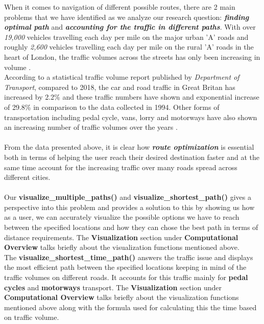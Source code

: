 \documentclass[fontsize=11pt]{IEEEtran}
\begin{document}
When it comes to navigation of different possible routes, there are 2 main problems that we have identified as we analyze our research question: \textbf{\textit{finding optimal path}} and \textbf{\textit{accounting for the traffic in different paths}}. With over \textit{19,000} vehicles travelling each day per mile on the major urban 'A' roads and roughly \textit{2,600} vehicles travelling each day per mile on the rural 'A' roads in the heart of London, the traffic volumes across the streets has only been increasing in volume \cite{9}. \\
According to a statistical traffic volume report published by \textit{Department of Transport}, compared to 2018, the car and road traffic in Great Britan has increased by  2.2\% and these traffic numbers have shown and exponential increase of 29.8\% in comparison to the data collected in 1994. Other forms of transportation including pedal cycle, vans, lorry and motorways have also shown an increasing number of traffic volumes over the years \cite{10}. \\ \\
From the data presented above, it is clear how \textbf{\textit{route optimization}} is essential both in terms of helping the user reach their desired destination faster and at the same time account for the increasing traffic over many roads spread across different cities. \\ \\
Our \textbf{visualize\_multiple\_paths()} and \textbf{visualize\_shortest\_path()} gives a perspective into this problem and provides a solution to this by showing us how as a user, we can accurately visualize the possible options we have to reach between the specified locations and how they can chose the best path in terms of distance requirements. The \textbf{Visualization} section under \textbf{Computational Overview} talks briefly about the visualization functions mentioned above.
\\
The \textbf{visualize\_shortest\_time\_path()} answers the traffic issue and displays the most efficient path between the specified locations keeping in mind of the traffic volumes on different roads. It accounts for this traffic mainly for \textbf{pedal cycles} and \textbf{motorways} transport. The \textbf{Visualization} section under \textbf{Computational Overview} talks briefly about the visualization functions mentioned above along with the formula used for calculating this the time based on traffic volume.
\end{document}
